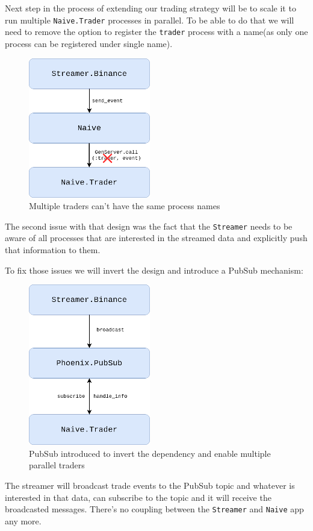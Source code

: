 \documentclass[
]{book}
\begin{document}
Next step in the process of extending our trading strategy will be to scale it to run multiple \texttt{Naive.Trader} processes in parallel. To be able to do that we will need to remove the option to register the \texttt{trader} process with a name(as only one process can be registered under single name).

\begin{figure}
\centering
\includegraphics{images/chapter_03_02_current_situation_failed.png}
\caption{Multiple traders can't have the same process names}
\end{figure}

The second issue with that design was the fact that the \texttt{Streamer} needs to be aware of all processes that are interested in the streamed data and explicitly push that information to them.

To fix those issues we will invert the design and introduce a PubSub mechanism:

\begin{figure}
\centering
\includegraphics{images/chapter_03_03_phoenix_pubsub.png}
\caption{PubSub introduced to invert the dependency and enable multiple parallel traders}
\end{figure}

The streamer will broadcast trade events to the PubSub topic and whatever is interested in that data, can subscribe to the topic and it will receive the broadcasted messages.
There's no coupling between the \texttt{Streamer} and \texttt{Naive} app any more.
\end{document}
